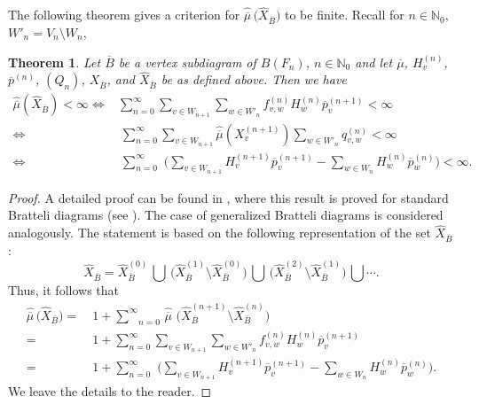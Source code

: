 \documentclass[11pt,reqno]{amsart}
\theoremstyle{definition}
\theoremstyle{remark}
\theoremstyle{plain}
\newtheorem{theorem}[definition]{Theorem}
\def\ol{\overline}
\def\wh{\widehat}
\newcommand{\N}{\mathbb N}
\newcommand{\be}{\begin{equation}}
\newcommand{\ee}{\end{equation}}
\newcommand{\ba}{\begin{aligned}}
\newcommand{\ea}{\end{aligned}}
\numberwithin{equation}{section}
\begin{document}
The following theorem gives a criterion for $\wh{\ol  \mu} \,\big( \wh X_{\overline B} \big)$ to be finite. Recall for $n \in \N_0$, $W'_n = V_n \setminus W_n$,

\begin{theorem} \label{thm3 criterion vertex subd}
Let $\overline B$ be a vertex subdiagram of $B(F_n)$, $n \in \N_0$ and let $\ol \mu$, $H_v^{(n)}$, $\ol p^{(n)}$, $(Q_n)$, $X_{\overline B}$, and $\wh X_{\overline B}$ be as defined above. Then we have 
\be\label{eq3:three criteria}
\ba
\wh{\ol \mu}(\wh X_{\overline B})  < \infty  
\Longleftrightarrow & \sum_{n=0}^\infty \sum_{v \in W_{n+1}} 
\sum_{w \in W'_n} f^{(n)}_{v,w} H_w^{(n)} \ol p_v^{(n+1)} < \infty \\
\Longleftrightarrow & \ 
\sum_{n=0}^\infty \sum_{v \in W_{n+1}} \wh{\ol \mu }
(X_v^{(n+1)}) \sum_{w \in W'_n} q^{(n)}_{v,w} < \infty \\
\Longleftrightarrow & \ 
\sum_{n=0}^\infty \,\,\bigg( \sum_{v \in W_{n+1}}
H_v^{(n+1)}\overline p_v^{(n+1)} - 
 \sum_{w \in W_{n}} H_w^{(n)}\overline p_w^{(n)}\bigg) 
< \infty.
\ea
\ee
\end{theorem}

\begin{proof} 
A detailed proof can be found in \cite{BezuglyiKarpelKwiatkowski2015}, where this result is proved for standard Bratteli diagrams (see \cite[Theorem 2.2]{BezuglyiKarpelKwiatkowski2015}). The case of generalized Bratteli diagrams is considered analogously. 
The statement is based on the following representation of the set $\wh X_{\ol B}$:
\begin{equation*}
     \wh X_{\overline B} = \wh X_{\overline B}^{(0)} \,\bigcup\, \big( \wh X_{\overline B}^{(1)} \setminus \wh X_{\overline B}^{(0)} \big)\,\bigcup\, \big( \wh X_{\overline B}^{(2)} \setminus \wh X_{\overline B}^{(1)} \big)\,\bigcup \cdots.
\end{equation*} 
Thus, it follows that 
\begin{align}
    \wh{\ol  \mu} \,\big( \wh X_{\overline B} \big)   =&\  1 + \underset{n=0}{\overset{\infty}{\sum}}\, \wh{\ol  \mu} \,\,\big( \wh X_{\overline B}^{(n+1)} \setminus \wh X_{\overline B}^{(n)} \big) \nonumber\\
=&\ 1 + \sum_{n=0}^\infty \sum_{v \in W_{n+1}} 
\sum_{w \in W'_n} f^{(n)}_{v,w} H_w^{(n)} \ol p_v^{(n+1)}\label{eq: exten_representation}\\
=&\  1 +  \sum_{n=0}^\infty \,\,\bigg( \sum_{v \in W_{n+1}}
H_v^{(n+1)}\overline p_v^{(n+1)} - 
 \sum_{w \in W_{n}} H_w^{(n)}\overline p_w^{(n)}\bigg).\label{eq: exten_representation_1}
\end{align}
We leave the details to the reader. 
\end{proof}
\end{document}
